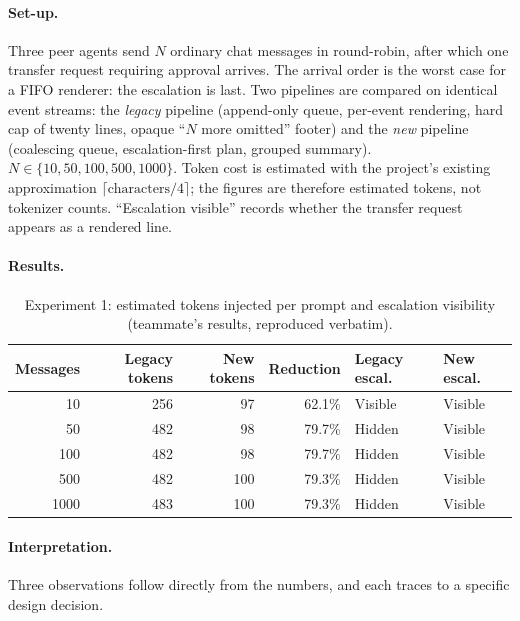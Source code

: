 \paragraph{Set-up.}
Three peer agents send $N$ ordinary chat messages in round-robin, after which one
transfer request requiring approval arrives. The arrival order is the worst case for a
FIFO renderer: the escalation is last. Two pipelines are compared on identical event
streams: the \emph{legacy} pipeline (append-only queue, per-event rendering, hard cap of
twenty lines, opaque ``$N$ more omitted'' footer) and the \emph{new} pipeline (coalescing
queue, escalation-first plan, grouped summary). $N \in \{10, 50, 100, 500, 1000\}$.
Token cost is estimated with the project's existing approximation
$\lceil \text{characters}/4 \rceil$; the figures are therefore estimated tokens, not
tokenizer counts. ``Escalation visible'' records whether the transfer request appears as a
rendered line.

\paragraph{Results.}

\begin{table}[htbp]
\centering\small
\caption{Experiment 1: estimated tokens injected per prompt and escalation visibility
(teammate's results, reproduced verbatim).}
\label{tab:flood}
\begin{tabular}{@{}rrrrll@{}}
\toprule
\textbf{Messages} & \textbf{Legacy tokens} & \textbf{New tokens} & \textbf{Reduction} & \textbf{Legacy escal.} & \textbf{New escal.} \\
\midrule
10   & 256 &  97 & 62.1\% & Visible & Visible \\
50   & 482 &  98 & 79.7\% & Hidden  & Visible \\
100  & 482 &  98 & 79.7\% & Hidden  & Visible \\
500  & 482 & 100 & 79.3\% & Hidden  & Visible \\
1000 & 483 & 100 & 79.3\% & Hidden  & Visible \\
\bottomrule
\end{tabular}
\end{table}

\paragraph{Interpretation.}
Three observations follow directly from the numbers, and each traces to a specific design
decision.

